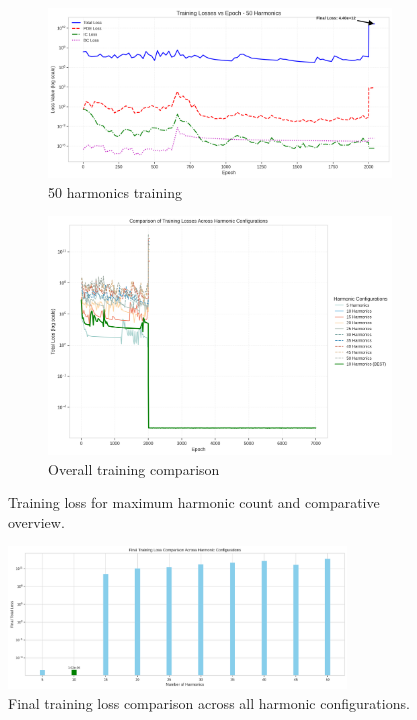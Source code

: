 \begin{figure}[H]
    \centering
    \begin{subfigure}[b]{0.48\textwidth}
        \centering
        \includegraphics[width=\textwidth]{figures/training_losses_50h.png}
        \caption{50 harmonics training}
    \end{subfigure}
    \hfill
    \begin{subfigure}[b]{0.48\textwidth}
        \centering
        \includegraphics[width=\textwidth]{figures/training_losses.png}
        \caption{Overall training comparison}
    \end{subfigure}
    \caption{Training loss for maximum harmonic count and comparative overview.}
    \label{fig:training_50h_overview}
\end{figure}

\begin{figure}[H]
    \centering
    \includegraphics[width=0.8\textwidth]{figures/training_losses_final.png}
    \caption{Final training loss comparison across all harmonic configurations.}
    \label{fig:training_final}
\end{figure}

